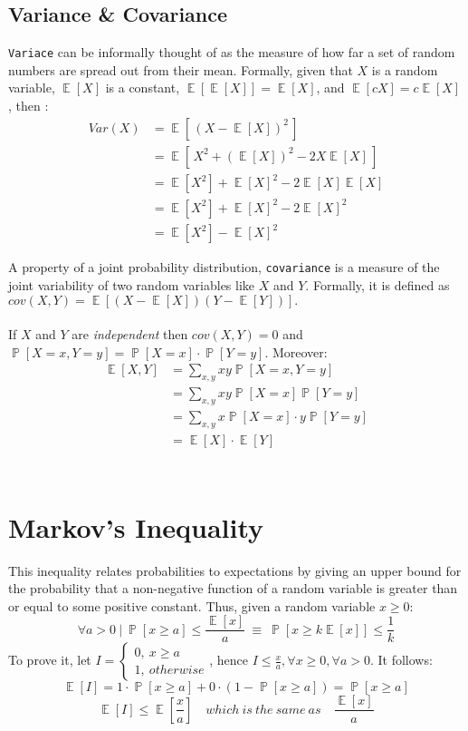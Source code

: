 \documentclass[twoside]{article}
\DeclareMathOperator{\E}{\mathbb{E}}
\DeclareMathOperator{\Prob}{\mathbb{P}}
\begin{document}
\subsection{Variance \& Covariance}
{\tt Variace} can be informally thought of as the measure of how far a set of random numbers are spread out from their mean. Formally, given that $X$ is a random variable, $\E[X]$ is a constant, $\E[\E[X]]=\E[X]$, and $\E[cX] = c\E[X]$, then :
\begin{align*} 
Var(X) &= \E[\,(X-\E[X])^2\,] \\
&= \E[\,X^2 +(\E[X])^2 - 2X\E[X]\,] \\
&= \E[X^2] + \E[X]^2 - 2\E[X]\E[X] \\
&= \E[X^2] + \E[X]^2 - 2\E[X]^2 \\
&= \E[X^2] -\E[X]^2
\end{align*}

A property of a joint probability distribution, {\tt covariance} is a measure of the joint variability of two random variables like $X$ and $Y$. Formally, it is defined as $cov(X,Y) = \E[(X-\E[X])(Y-\E[Y])].$ \\ \\
If $X$ and $Y$ are {\em independent} then $cov(X,Y) = 0$ and $\Prob[X=x,Y=y] = \Prob[X=x] \cdot \Prob[Y=y]$. Moreover:
\begin{align*} 
\E[X,Y] &= \sum_{x,y} xy\Prob[X=x,Y=y]\\
 &= \sum_{x,y} xy\Prob[X=x]\Prob[Y=y]\\
 &= \sum_{x,y} x\Prob[X=x]\cdot y\Prob[Y=y]\\
 &= \E[X]\cdot\E[Y] \\
\end{align*}
\\


\section{Markov's Inequality}
This inequality relates probabilities to expectations by giving an upper bound for the probability that a non-negative function of a random variable is greater than or equal to some positive constant. Thus, given a random variable $x \geq 0:$
\[\forall a>0\:|\:\Prob[x \geq a] \leq \frac{\E[x]}{a} \:\equiv\:
  \Prob[x \geq k\E[x]]  \leq \frac{1}{k}\]
To prove it, let $I = \begin{cases} 0,\: x \geq a \\ 1,\:otherwise \end{cases}$, hence $I \leq \frac{x}{a},\forall x \geq 0, \forall a > 0$. It follows:
\[\E[I] = 1 \cdot \Prob[x \geq a] + 0  \cdot (1-\Prob[x \geq a]) = \Prob[x \geq a]\]
\[\E[I]\leq \E[\frac{x}{a}]\quad which\: is\: the\: same\: as\quad \frac{\E[x]}{a} \]
\end{document}
